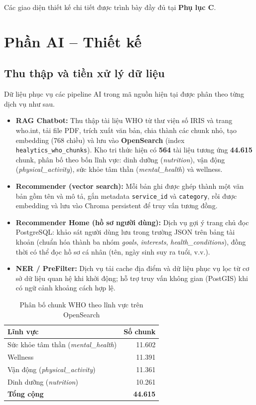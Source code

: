 Các giao diện thiết kế chi tiết được trình bày đầy đủ tại \textbf{Phụ lục C}.

\section{Phần AI – Thiết kế}
\subsection{Thu thập và tiền xử lý dữ liệu}

Dữ liệu phục vụ các pipeline AI trong mã nguồn hiện tại được phân theo từng dịch vụ như sau.

\begin{itemize}
    \item \textbf{RAG Chatbot:} Thu thập tài liệu WHO từ thư viện số IRIS và trang who.int, tải file PDF, trích xuất văn bản, chia thành các chunk nhỏ, tạo embedding (768 chiều) và lưu vào \textbf{OpenSearch} (index \texttt{healytics\_who\_chunks}). Kho tri thức hiện có \textbf{564} tài liệu tương ứng \textbf{44.615} chunk, phân bố theo bốn lĩnh vực: dinh dưỡng (\textit{nutrition}), vận động (\textit{physical\_activity}), sức khỏe tâm thần (\textit{mental\_health}) và wellness.
    \item \textbf{Recommender (vector search):} Mỗi bản ghi được ghép thành một văn bản gồm tên và mô tả, gắn metadata \texttt{service\_id} và \texttt{category}, rồi được embedding và lưu vào Chroma persistent để truy vấn tương đồng.
    \item \textbf{Recommender Home (hồ sơ người dùng):} Dịch vụ gợi ý trang chủ đọc PostgreSQL: khảo sát người dùng lưu trong trường JSON trên bảng tài khoản (chuẩn hóa thành ba nhóm \textit{goals}, \textit{interests}, \textit{health\_conditions}), đồng thời có thể đọc hồ sơ cá nhân (tên, ngày sinh suy ra tuổi, v.v.).
    \item \textbf{NER / PreFilter:} Dịch vụ tải cache địa điểm và dữ liệu phục vụ lọc từ cơ sở dữ liệu quan hệ khi khởi động; hỗ trợ truy vấn không gian (PostGIS) khi có ngữ cảnh khoảng cách hợp lệ.
\end{itemize}

\begin{table}[H]
\centering
\caption{Phân bố chunk WHO theo lĩnh vực trên OpenSearch}
\label{tab:who_domain_dist}
\begin{tabular}{|l|r|}
\hline
\textbf{Lĩnh vực} & \textbf{Số chunk} \\
\hline
Sức khỏe tâm thần (\textit{mental\_health}) & 11.602 \\
\hline
Wellness & 11.391 \\
\hline
Vận động (\textit{physical\_activity}) & 11.361 \\
\hline
Dinh dưỡng (\textit{nutrition}) & 10.261 \\
\hline
\textbf{Tổng cộng} & \textbf{44.615} \\
\hline
\end{tabular}
\end{table}

